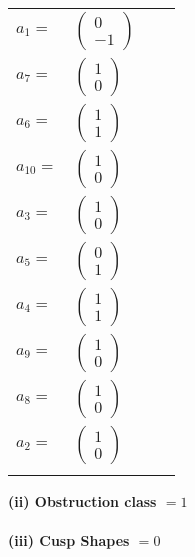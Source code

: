 \documentclass[1p]{elsarticle_modified}
\theoremstyle{definition}
\begin{document}
\begin{tabular}{m{7pt} m{180pt} m{7pt} m{180pt} }
\flushright $a_{1}=$&$\begin{pmatrix}0\\-1\end{pmatrix}$ \\
\flushright $a_{7}=$&$\begin{pmatrix}1\\0\end{pmatrix}$ \\
\flushright $a_{6}=$&$\begin{pmatrix}1\\1\end{pmatrix}$ \\
\flushright $a_{10}=$&$\begin{pmatrix}1\\0\end{pmatrix}$ \\
\flushright $a_{3}=$&$\begin{pmatrix}1\\0\end{pmatrix}$ \\
\flushright $a_{5}=$&$\begin{pmatrix}0\\1\end{pmatrix}$ \\
\flushright $a_{4}=$&$\begin{pmatrix}1\\1\end{pmatrix}$ \\
\flushright $a_{9}=$&$\begin{pmatrix}1\\0\end{pmatrix}$ \\
\flushright $a_{8}=$&$\begin{pmatrix}1\\0\end{pmatrix}$ \\
\flushright $a_{2}=$&$\begin{pmatrix}1\\0\end{pmatrix}$\\&\end{tabular}
\flushleft \textbf{(ii) Obstruction class $= 1$}\\~\\
\flushleft \textbf{(iii) Cusp Shapes $= 0$}\\~\\
\newpage\renewcommand{\arraystretch}{1}
\end{document}
